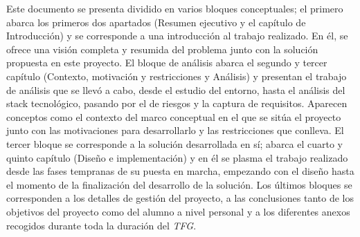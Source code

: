 Este documento se presenta dividido en varios bloques conceptuales; el primero abarca los primeros dos apartados (Resumen ejecutivo y el capítulo de Introducción) y se corresponde a una introducción al trabajo realizado. En él, se ofrece una visión completa y resumida del problema junto con la solución propuesta en este proyecto. El bloque de análisis abarca el segundo y tercer capítulo (Contexto, motivación y restricciones y Análisis) y presentan el trabajo de análisis que se llevó a cabo, desde el estudio del entorno, hasta el análisis del stack tecnológico, pasando por el de riesgos y la captura de requisitos. Aparecen conceptos como el contexto del marco conceptual en el que se sitúa el proyecto junto con las motivaciones para desarrollarlo y las restricciones que conlleva. El tercer bloque se corresponde a la solución desarrollada en sí; abarca el cuarto y quinto capítulo (Diseño e implementación) y en él se plasma el trabajo realizado desde las fases tempranas de su puesta en marcha, empezando con el diseño hasta el momento de la finalización del desarrollo de la solución.  Los últimos bloques se corresponden a los detalles de gestión del proyecto, a las conclusiones tanto de los objetivos del proyecto como del alumno a nivel personal y a los diferentes anexos recogidos durante toda la duración del \textit{TFG}.
